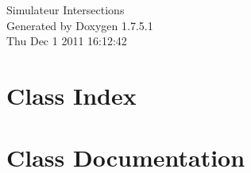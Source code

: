 \documentclass[a4paper]{book}
\begin{document}
\begin{titlepage}
\vspace*{7cm}
\begin{center}
{\Large \-Simulateur \-Intersections }\\
\vspace*{1cm}
{\large \-Generated by Doxygen 1.7.5.1}\\
\vspace*{0.5cm}
{\small Thu Dec 1 2011 16:12:42}\\
\end{center}
\end{titlepage}
\clearemptydoublepage
{}
\tableofcontents
\clearemptydoublepage
{}
\chapter{\-Class \-Index}

\chapter{\-Class \-Documentation}





























\printindex
\end{document}
